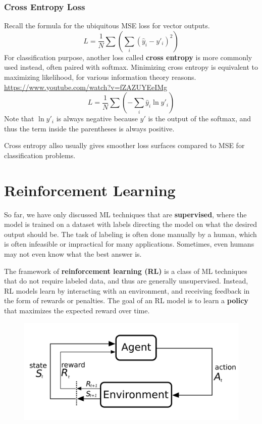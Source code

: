 \documentclass[12pt]{report}
\theoremstyle{definition}
\theoremstyle{remark}
\begin{document}
\subsection{Cross Entropy Loss}

Recall the formula for the ubiquitous MSE loss for vector outputs.
\begin{equation}
L = \frac{1}{N}\sum \left(\sum_i (\hat{y}_i-y'_i)^2\right)
\end{equation}
For classification purpose, another loss called \textbf{cross entropy} is more commonly used instead, often paired with softmax. Minimizing cross entropy is equivalent to maximizing likelihood, for various information theory reasons. \url{https://www.youtube.com/watch?v=fZAZUYEeIMg}
\begin{equation}
L = \frac{1}{N}\sum \left(-\sum_i \hat{y}_i \ln y'_i\right)
\end{equation}
Note that $\ln y'_i$ is always negative because $y'$ is the output of the softmax, and thus the term inside the parentheses is always positive.

Cross entropy allso usually gives smoother loss surfaces compared to MSE for classification problems.

\chapter{Reinforcement Learning} %
So far, we have only discussed ML techniques that are \textbf{supervised}, where the model is trained on a dataset with labels directing the model on what the desired output should be. The task of labeling is often done manually by a human, which is often infeasible or impractical for many applications. Sometimes, even humans may not even know what the best answer is.

The framework of \textbf{reinforcement learning (RL)} is a class of ML techniques that do not require labeled data, and thus are generally unsupervised. Instead, RL models learn by interacting with an environment, and receiving feedback in the form of rewards or penalties. The goal of an RL model is to learn a \textbf{policy} that maximizes the expected reward over time.

\begin{figure}[h]
    \centering
    \includegraphics[width=0.5\linewidth]{figs/RL_schematic.png}
    \caption{\cite{commons_filemarkov_2023}}
    \label{fig:enter-label}
\end{figure}
\end{document}
